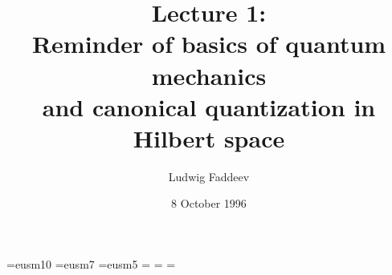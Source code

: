 
\font\teneusm=eusm10  \font\seveneusm=eusm7 
\font\fiveeusm=eusm5 
\newfam\eusmfam 
\textfont\eusmfam=\teneusm 
\scriptfont\eusmfam=\seveneusm 
\scriptscriptfont\eusmfam=\fiveeusm 
\def\Scr#1{{\fam\eusmfam\relax#1}}

\newcommand{\ScrA}{{\Scr A}} \newcommand{\ScrB}{{\Scr B}}
\newcommand{\ScrC}{{\Scr C}} \newcommand{\ScrD}{{\Scr D}}
\newcommand{\ScrE}{{\Scr E}} \newcommand{\ScrF}{{\Scr F}}
\newcommand{\ScrG}{{\Scr G}} \newcommand{\ScrH}{{\Scr H}}
\newcommand{\ScrI}{{\Scr I}} \newcommand{\ScrJ}{{\Scr J}}
\newcommand{\ScrK}{{\Scr K}} \newcommand{\ScrL}{{\Scr L}}
\newcommand{\ScrM}{{\Scr M}} \newcommand{\ScrN}{{\Scr N}}
\newcommand{\ScrO}{{\Scr O}} \newcommand{\ScrP}{{\Scr P}}
\newcommand{\ScrQ}{{\Scr Q}} \newcommand{\ScrR}{{\Scr R}}
\newcommand{\ScrS}{{\Scr S}} \newcommand{\ScrT}{{\Scr T}}
\newcommand{\ScrU}{{\Scr U}} \newcommand{\ScrV}{{\Scr V}}
\newcommand{\ScrW}{{\Scr W}} \newcommand{\ScrX}{{\Scr X}}
\newcommand{\ScrY}{{\Scr Y}} \newcommand{\ScrZ}{{\Scr Z}}


\newcommand{\grA}{{\frak A}}



\def\eps{\varepsilon}

\setlength{\textwidth}{6.5in}
\setlength{\textheight}{9.1in}
\setlength{\evensidemargin}{0in}
\setlength{\oddsidemargin}{0in}
\setlength{\topmargin}{-.75in}
\setlength{\parskip}{0.3\baselineskip}


\newcommand{\Le}{{{\mathchoice{\,{\scriptstyle\le}\,}
  {\,{\scriptstyle\le}\,}
  {\,{\scriptscriptstyle\le}\,}{\,{\scriptscriptstyle\le}\,}}}}
\newcommand{\Ge}{{{\mathchoice{\,{\scriptstyle\ge}\,}
  {\,{\scriptstyle\ge}\,}
  {\,{\scriptscriptstyle\ge}\,}{\,{\scriptscriptstyle\ge}\,}}}}






\title{Lecture 1:\\
 Reminder of basics of quantum mechanics\\
and canonical quantization in Hilbert space}
\author{Ludwig Faddeev}
\date{8  October 1996}

\maketitle

